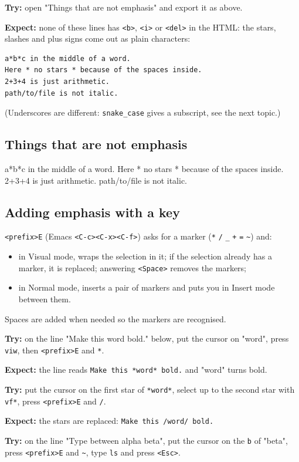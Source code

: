 \textbf{Try:} open "Things that are not emphasis" and export it as above.

\textbf{Expect:} none of these lines has \texttt{<b>}, \texttt{<i>} or \texttt{<del>} in the HTML:
the stars, slashes and plus signs come out as plain characters:
\begin{verbatim}
a*b*c in the middle of a word.
Here * no stars * because of the spaces inside.
2+3+4 is just arithmetic.
path/to/file is not italic.
\end{verbatim}
(Underscores are different: \texttt{snake\_case} gives a subscript, see the next
topic.)
\subsection{Things that are not emphasis}
\label{sec:orgaf6c356}
a*b*c in the middle of a word.
Here * no stars * because of the spaces inside.
2+3+4 is just arithmetic.
path/to/file is not italic.
\subsection{Adding emphasis with a key}
\label{sec:org3030266}
\texttt{<prefix>E} (Emacs \texttt{<C-c><C-x><C-f>}) asks for a marker (\texttt{*} \texttt{/} \texttt{\_} \texttt{+}
\texttt{=} \texttt{\textasciitilde{}}) and:
\begin{itemize}
\item in Visual mode, wraps the selection in it; if the selection already has a
marker, it is replaced; answering \texttt{<Space>} removes the markers;
\item in Normal mode, inserts a pair of markers and puts you in Insert mode
between them.
\end{itemize}
Spaces are added when needed so the markers are recognised.

\textbf{Try:} on the line "Make this word bold." below, put the cursor on "word",
press \texttt{viw}, then \texttt{<prefix>E} and \texttt{*}.

\textbf{Expect:} the line reads \texttt{Make this *word* bold.} and "word" turns bold.

\textbf{Try:} put the cursor on the first star of \texttt{*word*}, select up to the
second star with \texttt{vf*}, press \texttt{<prefix>E} and \texttt{/}.

\textbf{Expect:} the stars are replaced: \texttt{Make this /word/ bold.}

\textbf{Try:} on the line "Type between alpha beta", put the cursor on the \texttt{b} of
"beta", press \texttt{<prefix>E} and \texttt{\textasciitilde{}}, type \texttt{ls} and press \texttt{<Esc>}.

